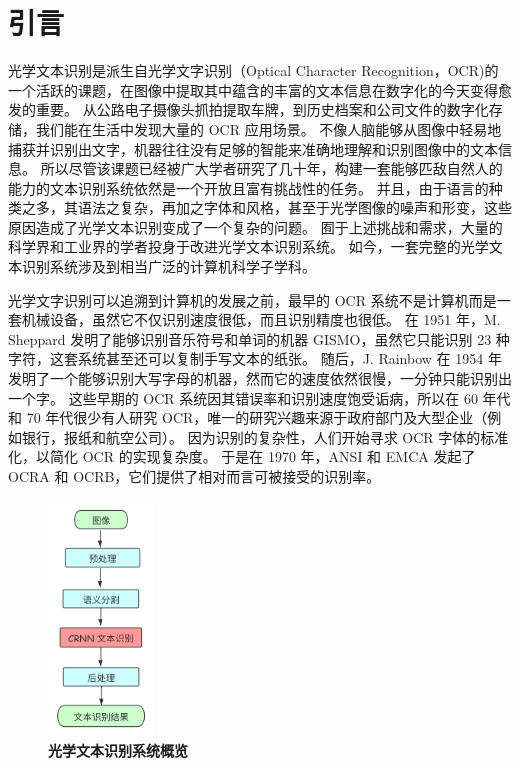 
\chapter{引言}
\label{chap:introduction}
光学文本识别是派生自光学文字识别（Optical Character Recognition，OCR)的一个活跃的课题，在图像中提取其中蕴含的丰富的文本信息在数字化的今天变得愈发的重要。
从公路电子摄像头抓拍提取车牌，到历史档案和公司文件的数字化存储，我们能在生活中发现大量的 OCR 应用场景。
不像人脑能够从图像中轻易地捕获并识别出文字，机器往往没有足够的智能来准确地理解和识别图像中的文本信息。
所以尽管该课题已经被广大学者研究了几十年，构建一套能够匹敌自然人的能力的文本识别系统依然是一个开放且富有挑战性的任务。
并且，由于语言的种类之多，其语法之复杂，再加之字体和风格，甚至于光学图像的噪声和形变，这些原因造成了光学文本识别变成了一个复杂的问题。
囿于上述挑战和需求，大量的科学界和工业界的学者投身于改进光学文本识别系统。
如今，一套完整的光学文本识别系统涉及到相当广泛的计算机科学子学科。

光学文字识别可以追溯到计算机的发展之前，最早的 OCR 系统不是计算机而是一套机械设备，虽然它不仅识别速度很低，而且识别精度也很低。
在 1951 年，M. Sheppard 发明了能够识别音乐符号和单词的机器 GISMO，虽然它只能识别 23 种字符，这套系统甚至还可以复制手写文本的纸张。
随后，J. Rainbow 在 1954 年发明了一个能够识别大写字母的机器，然而它的速度依然很慢，一分钟只能识别出一个字。
这些早期的 OCR 系统因其错误率和识别速度饱受诟病，所以在 60 年代和 70 年代很少有人研究 OCR，唯一的研究兴趣来源于政府部门及大型企业（例如银行，报纸和航空公司）。
因为识别的复杂性，人们开始寻求 OCR 字体的标准化，以简化 OCR 的实现复杂度。
于是在 1970 年，ANSI 和 EMCA 发起了 OCRA 和 OCRB，它们提供了相对而言可被接受的识别率。

\begin{figure}[h!]
	\centering
	\includegraphics[width=0.25\textwidth]{figure/resources/OCR_system.png}
	\caption{\textbf{光学文本识别系统概览}\label{ocr_system_overall}}
\end{figure}

